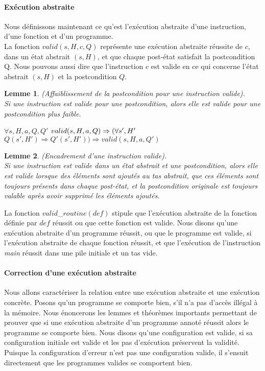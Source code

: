 \documentclass[11pt,openany]{article}
\newtheorem{lemme}{Lemme}
\begin{document}
			\paragraph{Ex\'ecution abstraite}
		Nous d\'efinissons maintenant ce qu'est l'ex\'ecution abstraite d'une instruction, d'une fonction et d'un programme.\\
		La fonction $valid(s,H,c,Q)$ repr\'esente une ex\'ecution abstraite  r\'eussite de $c$, dans un \'etat abstrait $(s,H)$, et que chaque post-\'etat satisfait la postcondition Q. Nous pouvons aussi dire que l'instruction $c$ est valide en ce qui concerne l'\'etat abstrait $(s,H)$ et la postcondition $Q$.
		\begin{lemme}
			(Affaiblissement de la postcondition pour une instruction valide).\\
			Si une instruction est valide pour une postcondition, alors elle est valide pour une postcondition plus faible.
			
$\forall s,H,a,Q,Q'$ $valid(s,H,a,Q)\Rightarrow\\(\forall s', H'$ $Q(s',H')\Rightarrow Q'(s',H'))\Rightarrow valid(s,H,a,Q')$
		\end{lemme}
		
		\begin{lemme}
			(Encadrement d'une instruction valide).\\
			Si une instruction est valide dans un \'etat abstrait et une postcondition, alors elle est valide lorsque des \'el\'ements sont ajout\'es au tas abstrait, que ces \'el\'ements sont toujours pr\'esents dans chaque post-\'etat, et la postcondition originale est toujours valable apr\`es avoir supprim\'e les \'el\'ements ajout\'es.
		\end{lemme}
		La fonction $valid$_$routine(def)$ stipule que l'ex\'ecution abstraite de la fonction d\'efinie par $def$ r\'eussit ou que cette fonction est valide. Nous disons qu'une ex\'ecution abstraite d'un programme r\'eussit, ou que le programme est valide, si l'ex\'ecution abstraite de chaque fonction r\'eussit, et que l'ex\'ecution de l'instruction \textit{main} r\'eussit dans une pile initiale et un tas vide.\\
			\paragraph{Correction d'une ex\'ecution abstraite}
		Nous allons caract\'eriser la relation entre une ex\'ecution abstraite et une ex\'ecution concr\`ete. Posons qu'un programme se comporte bien, s'il n'a pas d'acc\`es ill\'egal \`a la m\'emoire. Nous \'enoncerons les lemmes et th\'eor\`emes importants permettant de prouver que si une ex\'ecution abstraite d'un programme annot\'e r\'eussit alors le programme se comporte bien. Nous disons qu'une configuration est valide, si sa configuration initiale est valide et les pas d'ex\'ecution pr\'eservent la validit\'e. Puisque la configuration d'erreur n'est pas une configuration valide, il s'ensuit directement que les programmes valides se comportent bien.
		
\end{document}
